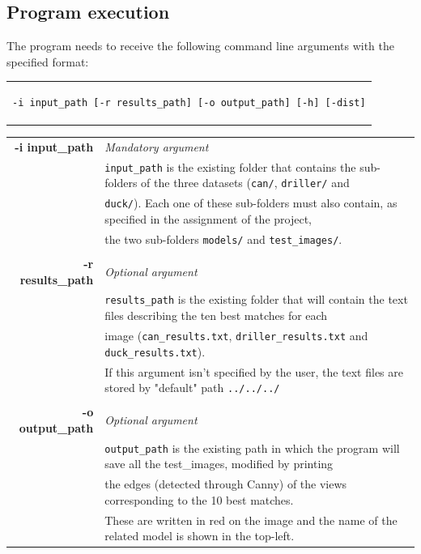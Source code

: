 \documentclass{article}
\begin{document}
\subsection{Program execution}\label{args}
The program needs to receive the following command line arguments with the specified format:
\begin{center}
\begin{tabular}{c}
\begin{lstlisting}[linewidth=320pt, basicstyle=\footnotesize\sffamily,]
-i input_path [-r results_path] [-o output_path] [-h] [-dist]
\end{lstlisting}
\end{tabular}
\end{center}
\begin{table}[H]
\footnotesize\centering
\begin{tabular}{rl}
\textbf{-i input\_path} & {\textit{Mandatory argument}}\\
& {\texttt{input\_path} is the existing folder that contains the sub-folders of the three datasets (\texttt{can/}, \texttt{driller/} and}\\
& {\texttt{duck/}). Each one of these sub-folders must also contain, as specified in the assignment of the project,}\\
&{the two sub-folders \texttt{models/} and \texttt{test\_images/}.}\\
&\\
\textbf{-r results\_path} & {\textit{Optional argument}}\\
& {\texttt{results\_path} is the existing folder that will contain the text files describing the ten best matches for each}\\
& {image (\texttt{can\_results.txt}, \texttt{driller\_results.txt} and \texttt{duck\_results.txt}).}\\
& {If this argument isn't specified by the user, the text files are stored by "default" path \texttt{../../../}}\\
&\\
\textbf{-o output\_path} & {\textit{Optional argument}}\\
& {\texttt{output\_path} is the existing path in which the program will save all the test\_images, modified by printing}\\
&{the edges (detected through Canny) of the views corresponding to the 10 best matches.}\\
&{These are written in red on the image and the name of the related model is shown in the top-left.}\\

\end{tabular}
\end{table}
\end{document}
